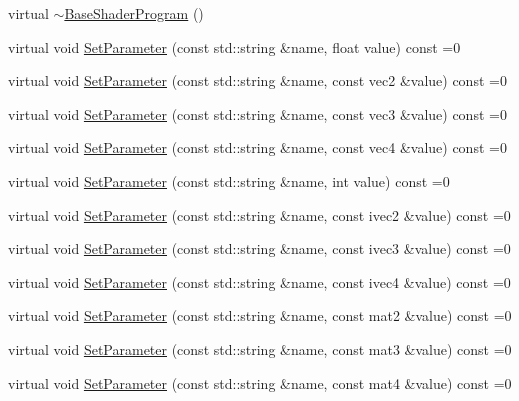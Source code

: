 \begin{DoxyCompactItemize}
\item 
virtual \hyperlink{class_agmd_1_1_base_shader_program_a86dfe4c2dbe367e5db23e31a223c1cc3}{$\sim$\+Base\+Shader\+Program} ()
\item 
virtual void \hyperlink{class_agmd_1_1_base_shader_program_a686505b3561b39d3dcd1600f0ace6e9a}{Set\+Parameter} (const std\+::string \&name, float value) const =0
\item 
virtual void \hyperlink{class_agmd_1_1_base_shader_program_a16b063b92bece84a9a0a350f97962bf5}{Set\+Parameter} (const std\+::string \&name, const vec2 \&value) const =0
\item 
virtual void \hyperlink{class_agmd_1_1_base_shader_program_a8e052f62b56f4c1eeedec3c3ce0b0bc7}{Set\+Parameter} (const std\+::string \&name, const vec3 \&value) const =0
\item 
virtual void \hyperlink{class_agmd_1_1_base_shader_program_ab46d82ff3d62fac5b7b163c54191870b}{Set\+Parameter} (const std\+::string \&name, const vec4 \&value) const =0
\item 
virtual void \hyperlink{class_agmd_1_1_base_shader_program_abeb81bff85334f5915dc8b08867082f7}{Set\+Parameter} (const std\+::string \&name, int value) const =0
\item 
virtual void \hyperlink{class_agmd_1_1_base_shader_program_ac3db4f8ae11e77e15ba5cdbe81bb7082}{Set\+Parameter} (const std\+::string \&name, const ivec2 \&value) const =0
\item 
virtual void \hyperlink{class_agmd_1_1_base_shader_program_a2e81859b0d17b8c347c612fb31adc66d}{Set\+Parameter} (const std\+::string \&name, const ivec3 \&value) const =0
\item 
virtual void \hyperlink{class_agmd_1_1_base_shader_program_a336172df798e80fe5fae9b41200a5eab}{Set\+Parameter} (const std\+::string \&name, const ivec4 \&value) const =0
\item 
virtual void \hyperlink{class_agmd_1_1_base_shader_program_af2b54d840ee95715c3a395065252e9b8}{Set\+Parameter} (const std\+::string \&name, const mat2 \&value) const =0
\item 
virtual void \hyperlink{class_agmd_1_1_base_shader_program_abda61d7ebf3c1a946f58e00c79b699cb}{Set\+Parameter} (const std\+::string \&name, const mat3 \&value) const =0
\item 
virtual void \hyperlink{class_agmd_1_1_base_shader_program_a4e625ca495949cbc3de3390f167ba004}{Set\+Parameter} (const std\+::string \&name, const mat4 \&value) const =0
\item 

\end{DoxyCompactItemize}
